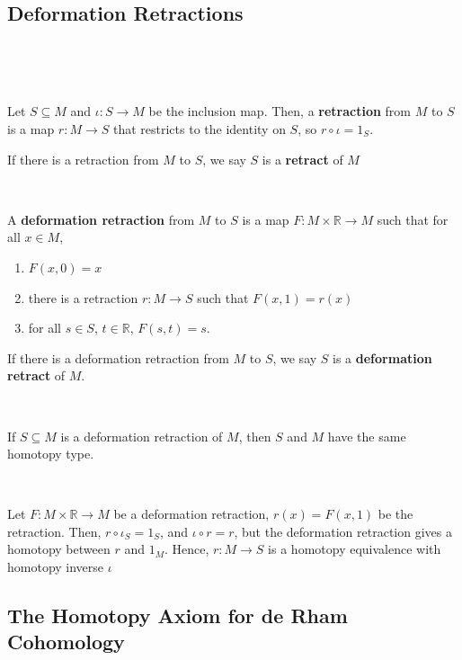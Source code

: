 \documentclass{article}
\begin{document}
\subsection{Deformation Retractions}
\

\begin{definition}[Retractions]
\

Let $S \subseteq M$ and $\iota: S \to M$ be the inclusion map. Then, a \textbf{retraction} from $M$ to $S$ is a map $r: M \to S$ that restricts to the identity on $S$, so $r \circ \iota = 1_S$. 

If there is a retraction from $M$ to $S$, we say $S$ is a \textbf{retract} of $M$ 
\end{definition}

\begin{definition}
\

A \textbf{deformation retraction} from $M$ to $S$ is a map $F: M \times \mathbb{R} \to M$ such that for all $x \in M$, \begin{enumerate}
  \item $F(x,0) = x$
  \item there is a retraction $r: M \to S$ such that $F(x,1) = r(x)$
  \item for all $s \in S$, $t \in \mathbb{R}$, $F(s,t) = s$.
\end{enumerate} 

If there is a deformation retraction from $M$ to $S$, we say $S$ is a \textbf{deformation retract} of $M$.  
\end{definition}

\begin{proposition}
\

If $S \subseteq M$ is a deformation retraction of $M$, then $S$ and $M$ have the same homotopy type.
\end{proposition}

\begin{customproof}
\

Let $F: M \times \mathbb{R} \to M$ be a deformation retraction, $r(x) = F(x,1)$ be the retraction. Then, $r \circ \iota_S = 1_S$, and $\iota \circ r = r$, but the deformation retraction gives a homotopy between $r$ and $1_M$. Hence, $r: M \to S$ is a homotopy equivalence with homotopy inverse $\iota$
\end{customproof}

\subsection{The Homotopy Axiom for de Rham Cohomology}
\
\end{document}
